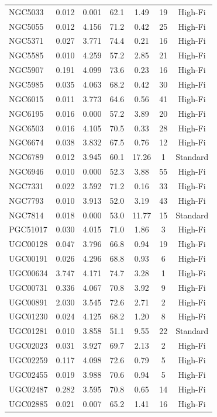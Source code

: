 \begin{longtable}{lcccccc}
NGC5033 & 0.012 & 0.001 & 62.1 & 1.49 & 19 & High-Fi \\
NGC5055 & 0.012 & 4.156 & 71.2 & 0.42 & 25 & High-Fi \\
NGC5371 & 0.027 & 3.771 & 74.4 & 0.21 & 16 & High-Fi \\
NGC5585 & 0.010 & 4.259 & 57.2 & 2.85 & 21 & High-Fi \\
NGC5907 & 0.191 & 4.099 & 73.6 & 0.23 & 16 & High-Fi \\
NGC5985 & 0.035 & 4.063 & 68.2 & 0.42 & 30 & High-Fi \\
NGC6015 & 0.011 & 3.773 & 64.6 & 0.56 & 41 & High-Fi \\
NGC6195 & 0.016 & 0.000 & 57.2 & 3.89 & 20 & High-Fi \\
NGC6503 & 0.016 & 4.105 & 70.5 & 0.33 & 28 & High-Fi \\
NGC6674 & 0.038 & 3.832 & 67.5 & 0.76 & 12 & High-Fi \\
NGC6789 & 0.012 & 3.945 & 60.1 & 17.26 & 1 & Standard \\
NGC6946 & 0.010 & 0.000 & 52.3 & 3.88 & 55 & High-Fi \\
NGC7331 & 0.022 & 3.592 & 71.2 & 0.16 & 33 & High-Fi \\
NGC7793 & 0.010 & 3.913 & 52.0 & 3.19 & 43 & High-Fi \\
NGC7814 & 0.018 & 0.000 & 53.0 & 11.77 & 15 & Standard \\
PGC51017 & 0.030 & 4.015 & 71.0 & 1.86 & 3 & High-Fi \\
UGC00128 & 0.047 & 3.796 & 66.8 & 0.94 & 19 & High-Fi \\
UGC00191 & 0.026 & 4.296 & 68.8 & 0.93 & 6 & High-Fi \\
UGC00634 & 3.747 & 4.171 & 74.7 & 3.28 & 1 & High-Fi \\
UGC00731 & 0.336 & 4.067 & 70.8 & 3.92 & 9 & High-Fi \\
UGC00891 & 2.030 & 3.545 & 72.6 & 2.71 & 2 & High-Fi \\
UGC01230 & 0.024 & 4.125 & 68.2 & 1.20 & 8 & High-Fi \\
UGC01281 & 0.010 & 3.858 & 51.1 & 9.55 & 22 & Standard \\
UGC02023 & 0.031 & 3.927 & 69.7 & 2.13 & 2 & High-Fi \\
UGC02259 & 0.117 & 4.098 & 72.6 & 0.79 & 5 & High-Fi \\
UGC02455 & 0.019 & 3.988 & 70.6 & 0.94 & 5 & High-Fi \\
UGC02487 & 0.282 & 3.595 & 70.8 & 0.65 & 14 & High-Fi \\
UGC02885 & 0.021 & 0.007 & 65.2 & 1.41 & 16 & High-Fi \\

\end{longtable}
